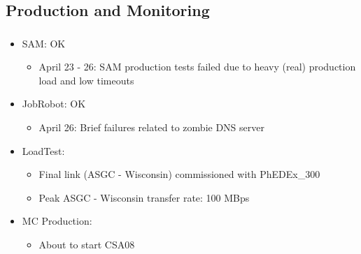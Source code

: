 \documentclass{beamer}
\begin{document}
\subsection{Production and Monitoring}
\begin{frame}
\frametitle{}
\begin{itemize}
    \item SAM: OK
    \begin{itemize}
        \item April 23 - 26: SAM production tests failed due to heavy (real) production load and low timeouts
    \end{itemize}
    \item JobRobot: OK 
    \begin{itemize}
        \item April 26: Brief failures related to zombie DNS server
    \end{itemize}
    \item LoadTest:
    \begin{itemize}
        \item Final link (ASGC - Wisconsin) commissioned with PhEDEx\_300
        \item Peak ASGC - Wisconsin transfer rate: 100 MBps
    \end{itemize}
    \item MC Production:
    \begin{itemize}
        \item About to start CSA08
    \end{itemize}
\end{itemize}
\end{frame}
\end{document}
